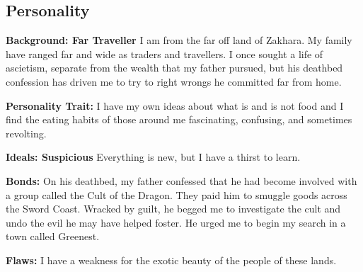 \documentclass[letterpaper,10pt,twoside,twocolumn,openany]{book}
\begin{document}
\subsection{Personality}

\textbf{Background: Far Traveller} I am from the far off land of Zakhara. My family have ranged far and wide as traders and travellers. I once sought a life of ascietism, separate from the wealth that my father pursued, but his deathbed confession has driven me to try to right wrongs he committed far from home.

\textbf{Personality Trait:} I have my own ideas about what is and is not food and I find the eating habits of those around me fascinating, confusing, and sometimes revolting.

\textbf{Ideals: Suspicious} Everything is new, but I have a thirst to learn.

\textbf{Bonds:} On his deathbed, my father confessed that he had become involved with a group called the Cult of the Dragon. They paid him to smuggle goods across the Sword Coast. Wracked by guilt, he begged me to investigate the cult and undo the evil he may have helped foster. He urged me to begin my search in a town called Greenest.

\textbf{Flaws:} I have a weakness for the exotic beauty of the people of these lands.
\end{document}
